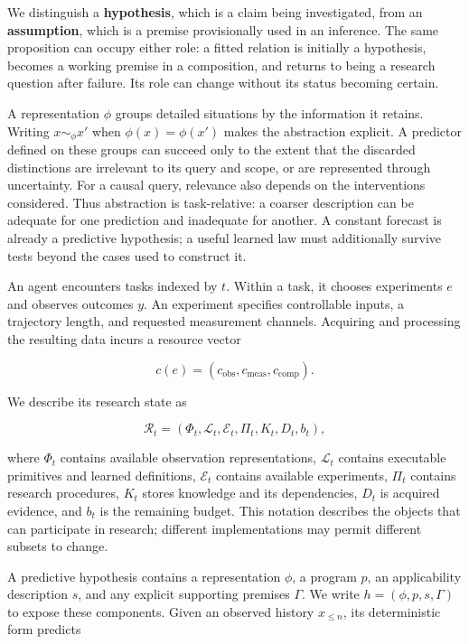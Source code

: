 \documentclass[twoside,11pt]{article}
\begin{document}
We distinguish a \textbf{hypothesis}, which is a claim being investigated, from an \textbf{assumption}, which is a premise provisionally used in an inference. The same proposition can occupy either role: a fitted relation is initially a hypothesis, becomes a working premise in a composition, and returns to being a research question after failure. Its role can change without its status becoming certain.


A representation \(\phi\) groups detailed situations by the information it retains. Writing \(x\sim_\phi x'\) when \(\phi(x)=\phi(x')\) makes the abstraction explicit. A predictor defined on these groups can succeed only to the extent that the discarded distinctions are irrelevant to its query and scope, or are represented through uncertainty. For a causal query, relevance also depends on the interventions considered. Thus abstraction is task-relative: a coarser description can be adequate for one prediction and inadequate for another. A constant forecast is already a predictive hypothesis; a useful learned law must additionally survive tests beyond the cases used to construct it.


An agent encounters tasks indexed by \(t\). Within a task, it chooses experiments \(e\) and observes outcomes \(y\). An experiment specifies controllable inputs, a trajectory length, and requested measurement channels. Acquiring and processing the resulting data incurs a resource vector


\[
c(e)=(c_{\mathrm{obs}},c_{\mathrm{meas}},c_{\mathrm{comp}}).
\]


We describe its research state as


\[
\mathcal R_t=(\Phi_t,\mathcal L_t,\mathcal E_t,\Pi_t,K_t,D_t,b_t),
\]


where \(\Phi_t\) contains available observation representations, \(\mathcal L_t\) contains executable primitives and learned definitions, \(\mathcal E_t\) contains available experiments, \(\Pi_t\) contains research procedures, \(K_t\) stores knowledge and its dependencies, \(D_t\) is acquired evidence, and \(b_t\) is the remaining budget. This notation describes the objects that can participate in research; different implementations may permit different subsets to change.


A predictive hypothesis contains a representation \(\phi\), a program \(p\), an applicability description \(s\), and any explicit supporting premises \(\Gamma\). We write \(h=(\phi,p,s,\Gamma)\) to expose these components. Given an observed history \(x_{\leq n}\), its deterministic form predicts
\end{document}
